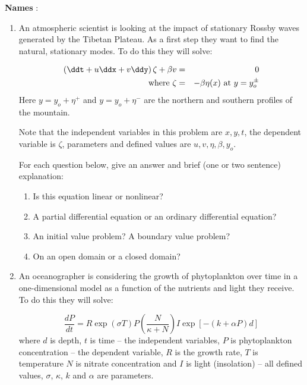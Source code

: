 \documentclass[12pt]{article}
\begin{document}
{\bf Names} :\\


\begin{enumerate}
\item An atmospheric scientist is looking at the impact of stationary Rossby waves generated by the Tibetan Plateau.  As a first step they want to find the natural, stationary modes.  To do this they will solve:

\begin{eqnarray}
\left(\ddt + u \ddx + v \ddy \right)\zeta + \beta v &=& 0 \\
{\rm where} \ \zeta &=& -\beta \eta(x)\  {\rm at}\  y = y_o^\pm
\end{eqnarray}
Here $y = y_o + \eta^+$ and $y = y_o + \eta^-$ are the northern and southern profiles of the mountain.

Note that the independent variables in this problem are $x, y, t$, the dependent variable is $\zeta$, parameters and defined values are $u, v, \eta, \beta, y_o$.

For each question below, give an answer and brief (one or two sentence) explanation:
\begin{enumerate}
\item Is this equation linear or nonlinear?\\[48pt]
\item A partial differential equation or an ordinary differential equation?\\[48pt]
\item An initial value problem? A boundary value problem?\\[48pt]
\item On an open domain or a closed domain?\\[48pt]
\end{enumerate}
\clearpage
\item An oceanographer is considering the growth of phytoplankton over time in a one-dimensional model as a function of the nutrients and light they receive.  To do this they will solve:

\begin{equation}
\frac {dP}{dt}= R \exp(\sigma T) P \left(\frac N {\kappa + N} \right) I \exp[-(k+\alpha P)d]
\end{equation}
where $d$ is depth, $t$ is time -- the independent variables, $P$ is phytoplankton concentration -- the dependent variable, $R$ is the growth rate, $T$ is temperature $N$ is nitrate concentration and $I$ is light (insolation) -- all defined values, $\sigma$, $\kappa$, $k$ and $\alpha$ are parameters.


\end{enumerate}
\end{document}
